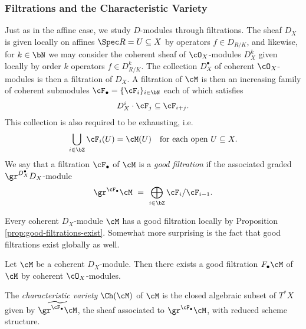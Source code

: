 \subsubsection{Filtrations and the Characteristic Variety}
Just as in the affine case, we study $D$-modules through filtrations. The sheaf $D_X$ is given locally on affines $\Spec R = U \subseteq X$ by operators $f\in D_{R/K}$, and likewise, for $k \in \bN$ we may consider the coherent sheaf of $\cO_X$-modules $D^k_X$ given locally by order $k$ operators $f \in D^k_{R/K}$. The collection $D^\bullet_X$ of coherent $\cO_X$-modules is then a filtration of $D_X$. A filtration of $\cM$ is then an increasing family of coherent submodules $\cF_\bullet = \{\cF_i\}_{i\in \bN}$ each of which satisfies
\begin{align*}
	D^i_X\cdot \cF_j \subseteq \cF_{i+j}.
\end{align*}
This collection is also required to be exhausting, i.e.
\begin{align*}
	\bigcup_{i \in \bZ} \cF_i(U) = \cM(U) \hspace{1em} \text{for each open} ~ U \subseteq X.
\end{align*}
We say that a filtration $\cF_\bullet$ of $\cM$ is a \emph{good filtration} if the associated graded $\gr^{D^\bullet_X} D_X$-module
\begin{align*}
	\gr^{\cF_\bullet} \cM ~=~ \bigoplus_{i\in \bZ} \cF_i/\cF_{i-1}.
\end{align*}

Every coherent $D_X$-module $\cM$ has a good filtration locally by Proposition \ref{prop:good-filtrations-exist}. Somewhat more surprising is the fact that good filtrations exist globally as well.
\begin{lem}\label{lem:global-good-filtrations-exist}
	Let $\cM$ be a coherent $D_X$-module. Then there exists a good filtration $F_\bullet \cM$ of $\cM$ by coherent $\cO_X$-modules.
\end{lem}
\begin{prf}
	
\end{prf}
\begin{defn}\label{defn:characteristic-variety}
	The \emph{characteristic variety} $\Ch(\cM)$ of $\cM$ is the closed algebraic subset of $T^*X$ given by $\widetilde{\gr^{\cF_\bullet}\cM}$, the sheaf associated to $\gr^{\cF_\bullet}\cM$, with reduced scheme structure.
\end{defn}

\newpage

